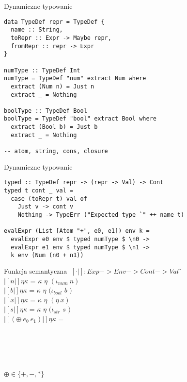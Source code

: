 \documentclass[12pt,serif]{beamer}
\begin{document}
\begin{frame}[fragile]{Dynamiczne typowanie}
\footnotesize \begin{verbatim}
data TypeDef repr = TypeDef {
  name :: String,
  toRepr :: Expr -> Maybe repr,
  fromRepr :: repr -> Expr
}

numType :: TypeDef Int
numType = TypeDef "num" extract Num where
  extract (Num n) = Just n
  extract _ = Nothing

boolType :: TypeDef Bool
boolType = TypeDef "bool" extract Bool where
  extract (Bool b) = Just b
  extract _ = Nothing
  
-- atom, string, cons, closure
\end{verbatim}
\end{frame}

\begin{frame}[fragile]{Dynamiczne typowanie}
\footnotesize \begin{verbatim}
typed :: TypeDef repr -> (repr -> Val) -> Cont
typed t cont _ val =
  case (toRepr t) val of
    Just v -> cont v
    Nothing -> TypeErr ("Expected type `" ++ name t)

evalExpr (List [Atom "+", e0, e1]) env k =
  evalExpr e0 env $ typed numType $ \n0 ->
  evalExpr e1 env $ typed numType $ \n1 ->
  k env (Num (n0 + n1))
\end{verbatim}
\end{frame}


\begin{frame}{Funkcja semantyczna}
$|[ \cdot |]: Exp -> Env -> Cont -> Val^{\star}$ \newline
\\
$|[n|] \eta \kappa$ = $\kappa$ $\eta$ $(\iota_{num}~n)$ \\
$|[b|] \eta \kappa$ = $\kappa$ $\eta$ $(\iota_{bool}$ $b$ $)$ \\
$|[x|] \eta \kappa$ = $\kappa$ $\eta$ $(\eta~x)$ \\
$|[s|] \eta \kappa$ = $\kappa$ $\eta$ $(\iota_{str}$ $s$ $)$ \newline
\\
$|[(\oplus~e_0~e_1)|] \eta \kappa$ = \\
\hspace{1em}{$|[e_0|]$ $\eta$ ($\lambda \eta_0 n_0$ .} \\
\hspace{2em}{$|[e_1|]$ $\eta$ ($\lambda \eta_1 n_1$ .} \\
 \\
 \\
 \newline
\\
$\oplus \in \{+,-,*\}$
\end{frame}
\end{document}
